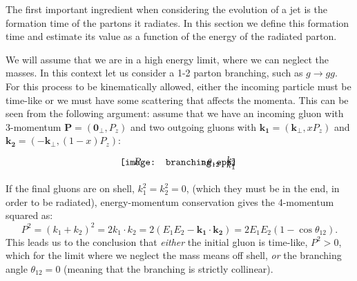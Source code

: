 \documentclass[a4paper,12pt]{article}
\numberwithin{equation}{section}
\begin{document}
The first important ingredient when considering the evolution of a jet is the formation time of the partons it radiates. In this section we define this formation time and estimate its value as a function of the energy of the radiated parton. 

We will assume that we are in a high energy limit, where we can neglect the masses. In this context let us consider a  1-2 parton branching, such as $g\rightarrow gg$.
For this process to be kinematically allowed, either the incoming particle must be time-like or we must have some scattering that affects the momenta. This can be seen from the following argument: assume that we have an incoming gluon with 3-momentum $\mathbf{P}=(\mathbf{0_\perp},P_z)$ and two outgoing gluons with $\mathbf{k_1}=(\mathbf{k_\perp},xP_z)$ and $\mathbf{k_2}=(-\mathbf{k_\perp},(1-x)P_z)$:
\begin{equation}
\begin{gathered}
\begin{tikzpicture}
    \node[anchor=south west,inner sep=0] (image) at (0,0) {\texttt{[image: branching.eps]}};
    \begin{scope}[x={(image.south east)},y={(image.north west)}]
        \draw[] (0.70,0.35) arc (-20:20:0.5);
        \node[] at (0.15, 0.65) {$P$};
        \node[] at (0.95, 0.25) {$k_1$};
		\node[] at (0.95, 0.75) {$k_2$};
        \node[] at (0.8, 0.5) {$\theta_{12}$};
    \end{scope}
\end{tikzpicture}
\end{gathered}
\end{equation}
If the final gluons are on shell, $k_1^2=k_2^2=0$, (which they must be in the end, in order to be radiated), energy-momentum conservation gives the 4-momentum squared as:
\begin{equation}
P^2=(k_1+k_2)^2=2 k_1 \cdot k_2=2(E_1E_2-\mathbf{k_1}\cdot\mathbf{k_2})=2E_1E_2(1-\cos\theta_{12}).
\end{equation}
This leads us to the conclusion that \emph{either} the initial gluon is time-like, $P^2>0$, which for the limit where we neglect the mass means off shell, \emph{or} the branching angle $\theta_{12}=0$ (meaning that the branching is strictly collinear).
\end{document}
